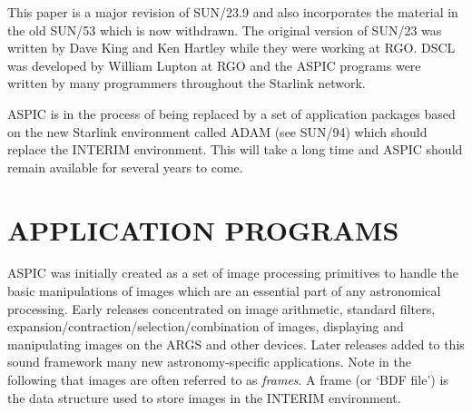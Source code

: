 This paper is a major revision of SUN/23.9 and also incorporates the material
in the old SUN/53 which is now withdrawn.
The original version of SUN/23 was written by Dave King and Ken Hartley while
they were working at RGO.
DSCL was developed by William Lupton at RGO and the ASPIC programs were written
by many programmers throughout the Starlink network.

ASPIC is in the process of being replaced by a set of application packages
based on the new Starlink environment called ADAM (see SUN/94) which should
replace the INTERIM environment.
This will take a long time and ASPIC should remain available for several years
to come.

\section {APPLICATION PROGRAMS}

ASPIC was initially created as a set of image processing primitives to handle
the basic manipulations of images which are an essential part of any
astronomical processing.
Early releases concentrated on image arithmetic, standard filters,
expansion/contraction/selection/combination of images, displaying and
manipulating images on the ARGS and other devices.
Later releases added to this sound framework many new astronomy-specific
applications.
Note in the following that images are often referred to as {\em frames}.
A frame (or `BDF file') is the data structure used to store images in the
INTERIM environment.

